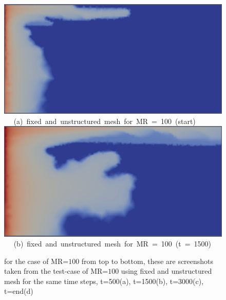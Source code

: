 \begin{landscape}
\begin{figure}[ht] 
\vbox{
\hbox{\hspace{3.5cm}
\includegraphics[width=.8\textwidth]{./Pics1/mr100_fixed/mr100_fixed_500.pdf} 
}
\vspace{0.0cm}
\hbox{\hspace{4.0cm} (a) fixed and unstructured mesh for MR = 100 (start)   
}
\hbox{\hspace{3.5cm}
\includegraphics[width=.8\textwidth]{./Pics1/mr100_fixed/mr100_fixed_1500.pdf}
}
\vspace{0.0cm}
\hbox{\hspace{3.75cm} (b) fixed and unstructured mesh for MR = 100 (t = 1500)   
}
}     
\caption{for the case of MR=$100$ from top to bottom, these are screenshots taken from the test-case of MR=$100$ using fixed and unstructured mesh for the same time steps, t=500(a), t=1500(b), t=3000(c), t=end(d) }
\label{fig:4testcase_a}
\end{figure}
\end{landscape}
\clearpage

